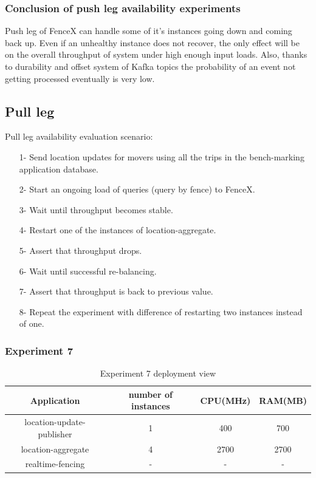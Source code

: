 \documentclass[a4]{report}
\begin{document}
    \subsubsection{Conclusion of push leg availability experiments}
    Push leg of FenceX can handle some of it's instances going down and coming back up.
    Even if an unhealthy instance does not recover, the only effect will be on the overall throughput of system under
    high enough input loads.
    Also, thanks to durability and offset system of Kafka topics the probability of an event not getting processed
    eventually is very low.

    \subsection{Pull leg}
    Pull leg availability evaluation scenario:
    \begin{itemize}
        \item[1-] Send location updates for movers using all the trips in the bench-marking application database.
        \item[2-] Start an ongoing load of queries (query by fence) to FenceX.
        \item[3-] Wait until throughput becomes stable.
        \item[4-] Restart one of the instances of location-aggregate.
        \item[5-] Assert that throughput drops.
        \item[6-] Wait until successful re-balancing.
        \item[7-] Assert that throughput is back to previous value.
        \item[8-] Repeat the experiment with difference of restarting two instances instead of one.
    \end{itemize}

    \clearpage

    \subsubsection{Experiment 7}
    \begin{table}[h!]
        \centering
        \begin{tabular}{|c|c|c|c|}
            \hline
            Application               & number of instances & CPU(MHz) & RAM(MB) \\
            \hline
            location-update-publisher & 1                   & 400      & 700     \\
            location-aggregate        & 4                   & 2700     & 2700    \\
            realtime-fencing          & -                   & -        & -       \\
            \hline
        \end{tabular}
        \caption{Experiment 7 deployment view}
        \label{table:ex7-dv}
    \end{table}
\end{document}
